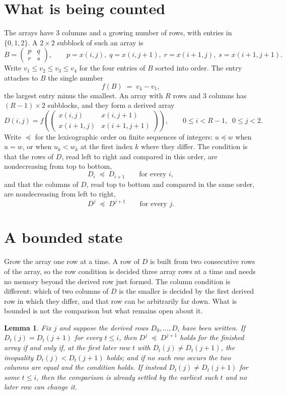 \documentclass[11pt,a4paper]{article}
\theoremstyle{plain}
\newtheorem{lemma}[theorem]{Lemma}
\theoremstyle{definition}
\begin{document}
\section{What is being counted}

The arrays have $3$ columns and a growing number of rows, with entries in $\{0,1,2\}$. A
$2\times2$ subblock of such an array is
\[
B=\begin{pmatrix} p & q \\ r & s \end{pmatrix},
\qquad p=x(i,j),\; q=x(i,j+1),\; r=x(i+1,j),\; s=x(i+1,j+1).
\]
Write $v_1\le v_2\le v_3\le v_4$ for the four entries of $B$ sorted into order. The entry attaches to $B$ the single number
\[
f(B)\;=\;v_4-v_1,
\]
the largest entry minus the smallest. An array with $R$ rows and $3$ columns has $(R-1)\times2$ subblocks, and they
form a derived array
\[
D(i,j)=f\!\left(\begin{pmatrix} x(i,j) & x(i,j+1) \\ x(i+1,j) & x(i+1,j+1)\end{pmatrix}
\right),\qquad 0\le i<R-1,\;\; 0\le j<2 .
\]
Write $\preceq$ for the lexicographic order on finite sequences of integers: $u\preceq w$ when
$u=w$, or when $u_k<w_k$ at the first index $k$ where they differ. The condition is that the
rows of $D$, read left to right and compared in this order, are nondecreasing from top to bottom,
\[
D_{i}\;\preceq\;D_{i+1}\qquad\text{for every } i,
\]
and that the columns of $D$, read top to bottom and compared in the same order, are nondecreasing
from left to right,
\[
D^{j}\;\preceq\;D^{j+1}\qquad\text{for every } j .
\]

\section{A bounded state}

Grow the array one row at a time. A row of $D$ is built from two consecutive rows of the array,
so the row condition is decided three array rows at a time and needs no memory beyond the
derived row just formed. The column condition is different: which of two columns of $D$ is the
smaller is decided by the first derived row in which they differ, and that row can be
arbitrarily far down. What is bounded is not the comparison but what remains open about it.

\begin{lemma}\label{lem:bits}
Fix $j$ and suppose the derived rows $D_0,\dots,D_i$ have been written. If $D_t(j)=D_t(j+1)$ for
every $t\le i$, then $D^{j}\;\preceq\;D^{j+1}$ holds for the finished array if and only if,
at the first later row $t$ with $D_t(j)\neq D_t(j+1)$, the inequality $D_t(j)<D_t(j+1)$
holds; and if no such row occurs the two columns are equal and the condition holds. If instead
$D_t(j)\neq D_t(j+1)$ for some $t\le i$, then the comparison is already settled by the earliest
such $t$ and no later row can change it.
\end{lemma}
\end{document}
